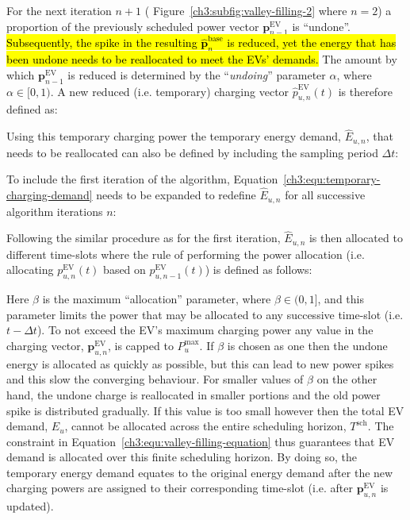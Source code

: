 For the next iteration $n+1$ ( Figure~\ref{ch3:subfig:valley-filling-2} where $n=2$) a proportion of the previously scheduled power vector $\textbf{p}^\text{EV}_{n-1}$ is ``undone''.
\hl{Subsequently, the spike in the resulting $\hat{\textbf{p}}^\text{base}_{n}$ is reduced, yet the energy that has been undone needs to be reallocated to meet the EVs' demands.}
The amount by which $\textbf{p}^\text{EV}_{n-1}$ is reduced is determined by the ``\textit{undoing}'' parameter $\alpha$, where $\alpha \in [0, 1)$.
A new reduced (i.e. temporary) charging vector $\hat{p}^\text{EV}_{u, n}(t)$ is therefore defined as:



Using this temporary charging power the temporary energy demand, $\hat{E}_{u,n}$, that needs to be reallocated can also be defined by including the sampling period $\Delta t$:



To include the first iteration of the algorithm, Equation~\ref{ch3:equ:temporary-charging-demand} needs to be expanded to redefine $\hat{E}_{u,n}$ for all successive algorithm iterations $n$:



Following the similar procedure as for the first iteration, $\hat{E}_{u,n}$ is then allocated to different time-slots where the rule of performing the power allocation (i.e. allocating $p^\text{EV}_{u,n}(t)$ based on $p^\text{EV}_{u,n-1}(t)$) is defined as follows:



\nomenclature[K]{$\alpha$}{\hladd{Undoing parameter to remove a portion of the temporary energy demand, $\hat{E}_{u,n}$, where $\alpha \in (0, 1]$}}
\nomenclature[K]{$\beta$}{Allocation parameter to assign a portion of the temporary energy demand, $\hat{E}_{u,n}$, where $\beta \in (0, 1]$}

Here $\beta$ is the maximum ``allocation'' parameter, where $\beta \in (0, 1]$, and this parameter limits the power that may be allocated to any successive time-slot (i.e. $t-\Delta t$).
To not exceed the EV's maximum charging power any value in the charging vector, $\textbf{p}^\text{EV}_{u,n}$, is capped to $P^\text{max}_{u}$.
If $\beta$ is chosen as one then the undone energy is allocated as quickly as possible, but this can lead to new power spikes and this slow the converging behaviour.
For smaller values of $\beta$ on the other hand, the undone charge is reallocated in smaller portions and the old power spike is distributed gradually.
If this value is too small however then the total EV demand, $E_u$, cannot be allocated across the entire scheduling horizon, $T^\text{sch}$.
The constraint in Equation~\ref{ch3:equ:valley-filling-equation} thus guarantees that EV demand is allocated over this finite scheduling horizon.
By doing so, the temporary energy demand equates to the original energy demand after the new charging powers are assigned to their corresponding time-slot (i.e. after $\textbf{p}^\text{EV}_{u,n}$ is updated).

